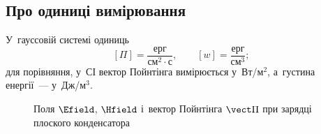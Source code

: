 \subsection*{Про одиниці вимірювання}


У~гауссовій системі одиниць
\begin{equation*}
	\left[\Pi\right] = \frac{\text{ерг}}{\text{см}^2\cdot\text{с}}, \qquad \left[w\right] = \frac{\text{ерг}}{\text{см}^3};
\end{equation*}
для порівняння, у~СІ вектор Пойнтінга вимірюється у~Вт/м$^2$, а~густина енергії~---
у~Дж/м$^3$.

\begin{figure}[htbp]\centering
	\caption{Поля $\Efield$, $\Hfield$ і~вектор Пойнтінга $\vect\Pi$ при зарядці плоского конденсатора\label{pic:CapacitorPoynting}}
\end{figure}

